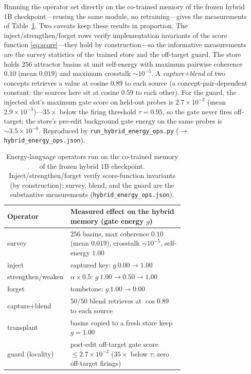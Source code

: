 \documentclass[11pt]{article}
\theoremstyle{remark}
\begin{document}
Running the operator set directly on the co-trained memory of the frozen hybrid
$1$B checkpoint---reusing the same module, no retraining---gives the measurements
of Table~\ref{tab:energyops}. Two caveats keep these results in proportion. The
inject/strengthen/forget rows verify implementation invariants of the score
function \eqref{eq:score}---they hold by construction---so the informative
measurements are the survey statistics of the trained store and the off-target
guard. The store holds $256$ attractor basins at unit self-energy with maximum
pairwise coherence $0.10$ (mean $0.019$) and maximum crosstalk
$\sim\!10^{-5}$. A \emph{capture+blend} of two concepts retrieves a value at
cosine $0.89$ to each source (a concept-pair-dependent constant: the sources
here sit at cosine $0.59$ to each other). For the guard, the injected slot's
maximum gate score on held-out probes is $2.7\times10^{-2}$ (mean
$2.9\times10^{-3}$)---$35\times$ below the firing threshold $\tau=0.95$, so the
gate never fires off-target; the store's pre-edit background gate energy on the
same probes is $\sim\!3.5\times10^{-6}$. Reproduced by
\texttt{run\_hybrid\_energy\_ops.py} ($\to$\,\texttt{hybrid\_energy\_ops.json}).

\begin{table}[t]
\centering\small
\begin{tabular}{@{}l >{\raggedright\arraybackslash}p{0.72\linewidth}@{}}
\toprule
Operator & Measured effect on the hybrid memory (gate energy $g$) \\
\midrule
survey & $256$ basins, max coherence $0.10$ (mean $0.019$), crosstalk $\sim\!10^{-5}$, self-energy $1.00$ \\
inject & captured key: $g\ 0.00\!\to\!1.00$ \\
strengthen/weaken & $\alpha\!\times\!0.5$: $g\ 1.00\!\to\!0.50\!\to\!1.00$ \\
forget & tombstone: $g\ 1.00\!\to\!0.00$ \\
capture+blend & $50/50$ blend retrieves at $\cos 0.89$ to each source \\
transplant & basins copied to a fresh store keep $g=1.00$ \\
guard (locality) & post-edit off-target gate score $\le 2.7\times10^{-2}$ ($35\times$ below $\tau$; zero off-target firings) \\
\bottomrule
\end{tabular}
\caption{Energy-language operators run on the co-trained memory of the frozen
hybrid $1$B checkpoint. Inject/strengthen/forget verify score-function invariants
(by construction); survey, blend, and the guard are the substantive measurements
(\texttt{hybrid\_energy\_ops.json}).}
\label{tab:energyops}
\end{table}
\end{document}
